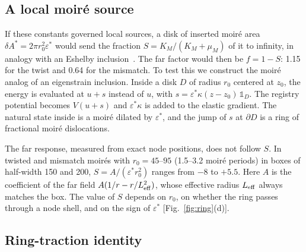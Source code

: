 \documentclass[prb,twocolumn,superscriptaddress,floatfix,10pt]{revtex4-2}
\begin{document}
\subsection{A local moir\'e source}

If these constants governed local sources, a disk of inserted moir\'e area $\delta A^*=2\pi r_0^2\varepsilon^*$ would send the fraction $S=K_M/(K_M+\mu_M)$ of it to infinity, in analogy with an Eshelby inclusion~\cite{Eshelby1957}. The far factor would then be $f=1-S$: 1.15 for the twist and 0.64 for the mismatch. To test this we construct the moir\'e analog of an eigenstrain inclusion. Inside a disk $D$ of radius $r_0$ centered at $z_0$, the energy is evaluated at $u+s$ instead of $u$, with $s=\varepsilon^*\kappa(z-z_0)\,\mathbb{1}_D$. The registry potential becomes $V(u+s)$ and $\varepsilon^*\kappa$ is added to the elastic gradient. The natural state inside is a moir\'e dilated by $\varepsilon^*$, and the jump of $s$ at $\partial D$ is a ring of fractional moir\'e dislocations.

The far response, measured from exact node positions, does not follow $S$. In twisted and mismatch moir\'es with $r_0=45$--$95$ (1.5--3.2 moir\'e periods) in boxes of half-width 150 and 200, $S=A/(\varepsilon^*r_0^2)$ ranges from $-8$ to $+5.5$. Here $A$ is the coefficient of the far field $A(1/r-r/L_{\rm eff}^2)$, whose effective radius $L_{\rm eff}$ always matches the box. The value of $S$ depends on $r_0$, on whether the ring passes through a node shell, and on the sign of $\varepsilon^*$ [Fig.~\ref{fig:ring}(d)].

\subsection{Ring-traction identity}
\end{document}
